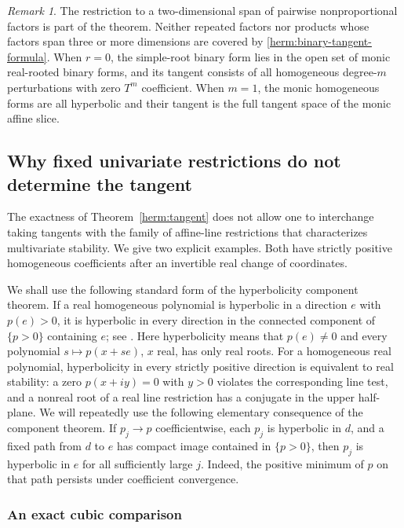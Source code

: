 \documentclass[reqno]{amsart}
\theoremstyle{definition}
\theoremstyle{remark}
\newtheorem{remark}[theorem]{Remark}
\begin{document}
\begin{remark}\label{herm:binary-localization-scope}
The restriction to a two-dimensional span of pairwise nonproportional
factors is part of the theorem.  Neither repeated factors nor products
whose factors span three or more dimensions are covered by
\eqref{herm:binary-tangent-formula}.
When $r=0$, the simple-root binary form lies in the open set of
monic real-rooted binary forms, and its tangent consists of all
homogeneous degree-$m$ perturbations with zero $T^m$ coefficient.
When $m=1$, the monic homogeneous forms are all hyperbolic and their
tangent is the full tangent space of the monic affine slice.
\end{remark}

\subsection{Why fixed univariate restrictions do not determine the tangent}

The exactness of Theorem~\ref{herm:tangent} does not allow one to
interchange taking tangents with the family of affine-line restrictions
that characterizes multivariate stability.  We give two explicit
examples.  Both have strictly positive homogeneous coefficients after
an invertible real change of coordinates.

We shall use the following standard form of the hyperbolicity component
theorem.  If a real homogeneous polynomial is hyperbolic in a direction
$e$ with $p(e)>0$, it is hyperbolic in every direction in the connected
component of $\{p>0\}$ containing $e$; see
\cite[Corollary~2.7 and Theorem~2.9]{HarveyLawson09}.
Here hyperbolicity means that $p(e)\ne0$ and every polynomial
$s\mapsto p(x+se)$, $x$ real, has only real roots.
For a homogeneous real polynomial, hyperbolicity in every strictly
positive direction is equivalent to real stability: a zero
$p(x+iy)=0$ with $y>0$ violates the corresponding line test, and a
nonreal root of a real line restriction has a conjugate in the upper
half-plane.  We will repeatedly use the following elementary consequence
of the component theorem.  If $p_j\to p$ coefficientwise, each $p_j$ is
hyperbolic in $d$, and a fixed path from $d$ to $e$ has compact image
contained in $\{p>0\}$, then $p_j$ is hyperbolic in $e$ for all
sufficiently large $j$.  Indeed, the positive minimum of $p$ on that
path persists under coefficient convergence.

\subsubsection{An exact cubic comparison}
\end{document}
